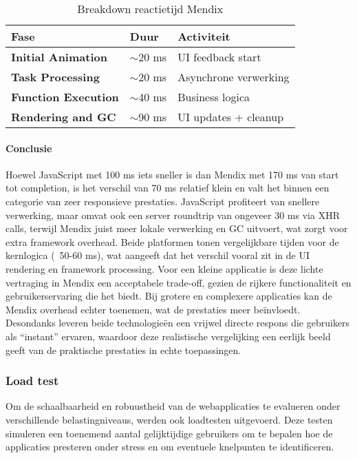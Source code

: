 \begin{table}[H]
    \centering
    \begin{tabular}{ |p{5cm}|p{3cm}|p{6cm}|}
        \hline
        \textbf{Fase} & \textbf{Duur} & \textbf{Activiteit}\\
        \hline
        \textbf{Initial Animation}  & $\sim$20 ms & \gls{UI} feedback start \\
        \hline
        \textbf{Task Processing} & $\sim$20 ms & Asynchrone verwerking \\
        \hline
        \textbf{Function Execution}  & $\sim$40 ms & Business logica \\
        \hline
        \textbf{Rendering and \gls{GC}}  & $\sim$90 ms & \gls{UI} updates + cleanup \\
        \hline                       
        
    \end{tabular}
    \caption[\centering Breakdown reactietijd Mendix]{\label{tab:breakdown Mendix reactietijd}Breakdown reactietijd Mendix}
\end{table}


\pagebreak
\newpage


\paragraph{Conclusie}
Hoewel JavaScript met 100 ms iets sneller is dan Mendix met 170 ms van start tot completion, is het verschil van 70 ms relatief klein en valt het binnen een categorie van zeer responsieve prestaties. JavaScript profiteert van snellere verwerking, maar omvat ook een server roundtrip van ongeveer 30 ms via \gls{XHR} calls, terwijl Mendix juist meer lokale verwerking en \gls{GC} uitvoert, wat zorgt voor extra framework overhead. Beide platformen tonen vergelijkbare tijden voor de kernlogica (~50-60 ms), wat aangeeft dat het verschil vooral zit in de \gls{UI} rendering en framework processing. Voor een kleine applicatie is deze lichte vertraging in Mendix een acceptabele trade-off, gezien de rijkere functionaliteit en gebruikerservaring die het biedt. Bij grotere en complexere applicaties kan de Mendix overhead echter toenemen, wat de prestaties meer beïnvloedt. Desondanks leveren beide technologieën een vrijwel directe respons die gebruikers als “instant” ervaren, waardoor deze realistische vergelijking een eerlijk beeld geeft van de praktische prestaties in echte toepassingen.



\subsubsection{Load test}
Om de schaalbaarheid en robuustheid van de webapplicaties te evalueren onder verschillende belastingniveaus, werden ook loadtesten uitgevoerd. Deze testen simuleren een toenemend aantal gelijktijdige gebruikers om te bepalen hoe de applicaties presteren onder stress en om eventuele knelpunten te identificeren.

